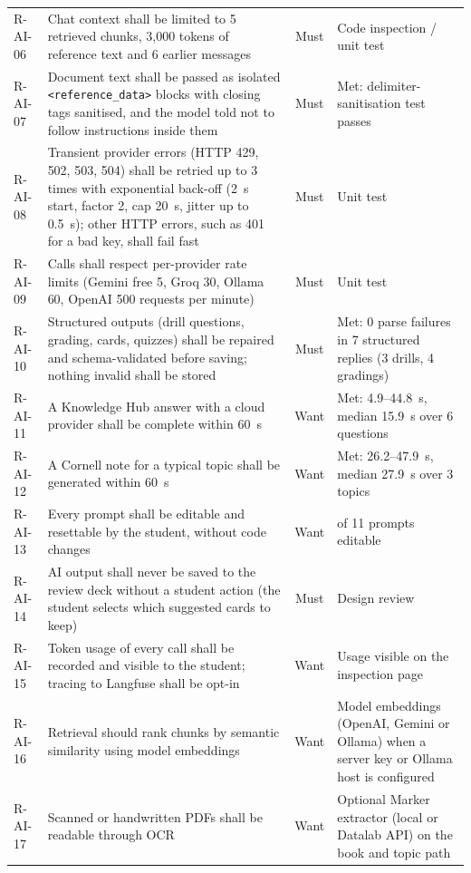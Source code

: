 \begin{small}
\begin{longtable}{@{}l >{\raggedright\arraybackslash}p{7.4cm} c >{\raggedright\arraybackslash}p{3.6cm}@{}}
R-AI-06 & Chat context shall be limited to 5 retrieved chunks, 3{,}000 tokens of reference text
and 6 earlier messages & Must & Code inspection / unit test\\
R-AI-07 & Document text shall be passed as isolated \texttt{<reference\_data>} blocks with closing
tags sanitised, and the model told not to follow instructions inside them \cite{owaspllm2025} & Must & Met:
delimiter-sanitisation test passes\\
R-AI-08 & Transient provider errors (HTTP 429, 502, 503, 504) shall be retried up to 3 times
with exponential back-off (2~s start, factor 2, cap 20~s, jitter up to 0.5~s); other HTTP errors,
such as 401 for a bad key, shall fail fast & Must & Unit test\\
R-AI-09 & Calls shall respect per-provider rate limits (Gemini free 5, Groq 30, Ollama 60,
OpenAI 500 requests per minute) & Must & Unit test\\
R-AI-10 & Structured outputs (drill questions, grading, cards, quizzes) shall be repaired and
schema-validated before saving; nothing invalid shall be stored & Must & Met: 0 parse failures in
7 structured replies (3 drills, 4 gradings)\\
R-AI-11 & A Knowledge Hub answer with a cloud provider shall be complete within 60~s & Want & Met:
4.9--44.8~s, median 15.9~s over 6 questions\\
R-AI-12 & A Cornell note for a typical topic shall be generated within 60~s & Want & Met:
26.2--47.9~s, median 27.9~s over 3 topics\\
R-AI-13 & Every prompt shall be editable and resettable by the student, without code changes &
Want & 11 of 11 prompts editable\\
R-AI-14 & AI output shall never be saved to the review deck without a student action (the student
selects which suggested cards to keep) & Must & Design review\\
R-AI-15 & Token usage of every call shall be recorded and visible to the student; tracing to
Langfuse shall be opt-in & Want & Usage visible on the inspection page\\
R-AI-16 & Retrieval should rank chunks by semantic similarity using model embeddings & Want &
Model embeddings (OpenAI, Gemini or Ollama) when a server key or Ollama host is configured\\
R-AI-17 & Scanned or handwritten PDFs shall be readable through OCR & Want & Optional Marker extractor
(local or Datalab API) on the book and topic path\\
\end{longtable}
\end{small}

